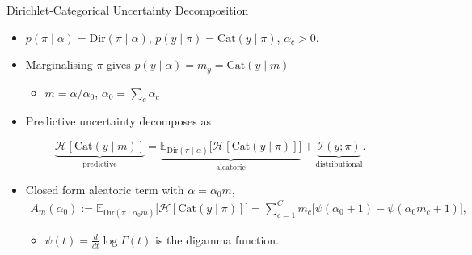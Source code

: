 \begin{frame}{Dirichlet-Categorical Uncertainty Decomposition}
\label{frm:backup-dirichlet-categorical-split}
\setlength{\abovedisplayskip}{4pt}
\setlength{\belowdisplayskip}{4pt}
\begin{itemize}
\setlength{\itemsep}{4mm}
\item $p(\pi\mid\alpha)=\mathrm{Dir}(\pi\mid\alpha)$, $p(y\mid\pi)=\mathrm{Cat}(y\mid\pi)$, $\alpha_c>0$.
\item Marginalising $\pi$ gives $p(y\mid\alpha)=m_y=\mathrm{Cat}(y\mid m)$ 
\begin{itemize}
\item $m=\alpha/\alpha_0$, $\alpha_0=\sum_c\alpha_c$ 
\end{itemize}
\item Predictive uncertainty decomposes as
\end{itemize}
\[
\underbrace{\mathcal H[\mathrm{Cat}(y\mid m)]}_{\text{predictive}}
=\underbrace{\mathbb E_{\mathrm{Dir}(\pi\mid\alpha)}
\bigl[\mathcal H[\mathrm{Cat}(y\mid\pi)]\bigr]}_{\text{aleatoric}}
+\underbrace{\mathcal I(y;\pi)}_{\text{distributional}}.
\]
\begin{itemize}
\item Closed form aleatoric term with $\alpha=\alpha_0m$,
\begin{align*}
A_m(\alpha_0)
:=\mathbb E_{\mathrm{Dir}(\pi\mid\alpha_0m)}
\bigl[\mathcal H[\mathrm{Cat}(y\mid\pi)]\bigr]
=\sum_{c=1}^{C}m_c\bigl[\psi(\alpha_0+1)-\psi(\alpha_0m_c+1)\bigr],
\end{align*}
\begin{itemize}
\item $\psi(t)=\frac{d}{dt}\log\Gamma(t)$ is the digamma function.
\end{itemize}
\end{itemize}
\end{frame}

